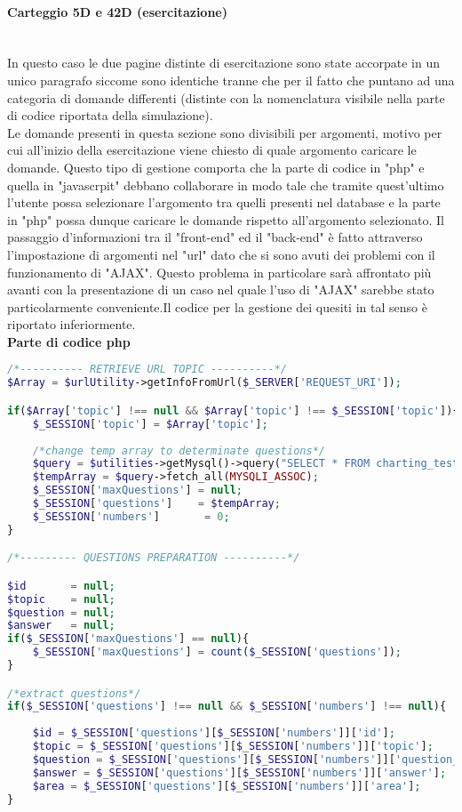 \paragraph{Carteggio 5D e 42D (esercitazione)}\leavevmode\\
In questo caso le due pagine distinte di esercitazione sono state accorpate in un unico paragrafo siccome sono identiche tranne che per il fatto che puntano ad una categoria di domande differenti (distinte con la nomenclatura visibile nella parte di codice riportata della simulazione).\\
Le domande presenti in questa sezione sono divisibili per argomenti, motivo per cui all'inizio della esercitazione viene chiesto di quale argomento caricare le domande. Questo tipo di gestione comporta che la parte di codice in "php" e quella in "javascrpit" debbano collaborare in modo tale che tramite quest'ultimo l'utente possa selezionare l'argomento tra quelli presenti nel database e la parte in "php" possa dunque caricare le domande rispetto all'argomento selezionato. Il passaggio d'informazioni tra il "front-end" ed il "back-end" è fatto attraverso l'impostazione di argomenti nel "url" dato che si sono avuti dei problemi con il funzionamento di "AJAX". Questo problema in particolare sarà affrontato più avanti con la presentazione di un caso nel quale l'uso di "AJAX" sarebbe stato particolarmente conveniente.Il codice per la gestione dei quesiti in tal senso è riportato inferiormente.\\

\textbf{Parte di codice php}\\

\begin{lstlisting}[language=php]
/*---------- RETRIEVE URL TOPIC ----------*/
$Array = $urlUtility->getInfoFromUrl($_SERVER['REQUEST_URI']);

if($Array['topic'] !== null && $Array['topic'] !== $_SESSION['topic']){
	$_SESSION['topic'] = $Array['topic'];
	
	/*change temp array to determinate questions*/
	$query = $utilities->getMysql()->query("SELECT * FROM charting_test_5d WHERE (topic = '{$Array['topic']}')");
	$tempArray = $query->fetch_all(MYSQLI_ASSOC);
	$_SESSION['maxQuestions'] = null;
	$_SESSION['questions']    = $tempArray;
	$_SESSION['numbers']       = 0;
}

/*--------- QUESTIONS PREPARATION ----------*/

$id       = null;
$topic    = null;
$question = null;
$answer   = null;
if($_SESSION['maxQuestions'] == null){
	$_SESSION['maxQuestions'] = count($_SESSION['questions']);
}

/*extract questions*/
if($_SESSION['questions'] !== null && $_SESSION['numbers'] !== null){
	
	$id = $_SESSION['questions'][$_SESSION['numbers']]['id'];
	$topic = $_SESSION['questions'][$_SESSION['numbers']]['topic'];
	$question = $_SESSION['questions'][$_SESSION['numbers']]['question_text'];
	$answer = $_SESSION['questions'][$_SESSION['numbers']]['answer'];
	$area = $_SESSION['questions'][$_SESSION['numbers']]['area'];	
}
\end{lstlisting}

